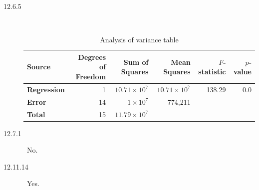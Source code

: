 \documentclass[letterpaper,10pt]{article}
\begin{document}
\begin{description}
\item[12.6.5]\ 
\begin{table}[htdp]
\caption{Analysis of variance table}
\begin{center}
\begin{tabular}{l|rrrrr}
\textbf{Source} & \textbf{Degrees of Freedom} & \textbf{Sum of Squares} & \textbf{Mean Squares} & \textbf{$F$-statistic} & \textbf{$p$-value} \\
\hline \textbf{Regression} & 1 & $10.71\times10^{7}$ & $10.71\times10^{7}$ & 138.29 & 0.0 \\
\textbf{Error} & 14 & $1\times10^{7}$ & 774,211 & & \\
\hline \textbf{Total} & 15 & $11.79\times10^{7}$ & & & 
\end{tabular}
\end{center}
\label{default}
\end{table}

\item[12.7.1]\ 
No.

\item[12.11.14]\ 
Yes.

\end {description}
\end{document}
